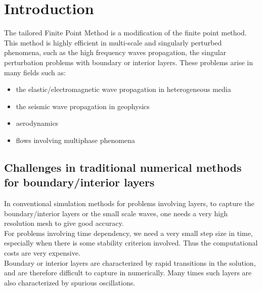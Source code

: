 
\chapter{Introduction} %

\label{Chapter1} %



The tailored Finite Point Method is a modification of the finite point method. This method is highly efficient in
multi-scale and singularly perturbed phenomena, such as the high frequency waves propagation, the singular perturbation problems with boundary or interior layers.
These problems arise in many fields such as:
\begin{itemize}
 \item the elastic/electromagnetic wave propagation in heterogeneous media
 \item the seismic wave propagation in geophysics
 \item aerodynamics
 \item flows involving multiphase phenomena
\end{itemize}


\section{Challenges in traditional numerical methods for
boundary/interior layers}
In conventional simulation methods for problems involving layers, to capture the
boundary/interior layers or the small scale waves, one needs a very high resolution mesh to
give good accuracy.\\
For problems involving time dependency, we need a very small step size in time, especially when there is some stability criterion involved. Thus the
computational costs are very expensive.\\
Boundary or interior layers are characterized by rapid transitions in the solution, and are therefore
difficult to capture in numerically.
Many times such layers are also characterized by spurious oscillations.\\

